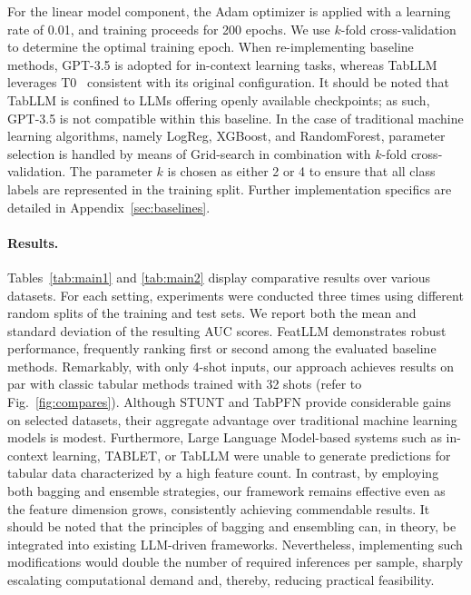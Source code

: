 For the linear model component, the Adam optimizer is applied with a learning rate of 0.01, and training proceeds for 200 epochs. We use $k$-fold cross-validation to determine the optimal training epoch. When re-implementing baseline methods, GPT-3.5 is adopted for in-context learning tasks, whereas TabLLM leverages T0~\cite{sanh2022multitask} consistent with its original configuration. It should be noted that TabLLM is confined to LLMs offering openly available checkpoints; as such, GPT-3.5 is not compatible within this baseline. In the case of traditional machine learning algorithms, namely LogReg, XGBoost, and RandomForest, parameter selection is handled by means of Grid-search in combination with $k$-fold cross-validation. The parameter $k$ is chosen as either 2 or 4 to ensure that all class labels are represented in the training split. Further implementation specifics are detailed in Appendix~\ref{sec:baselines}.

\vspace*{-0.12in}
\paragraph{Results.}
Tables~\ref{tab:main1} and \ref{tab:main2} display comparative results over various datasets. For each setting, experiments were conducted three times using different random splits of the training and test sets. We report both the mean and standard deviation of the resulting AUC scores. \textsf{FeatLLM} demonstrates robust performance, frequently ranking first or second among the evaluated baseline methods. Remarkably, with only 4-shot inputs, our approach achieves results on par with classic tabular methods trained with 32 shots (refer to Fig.~\ref{fig:compares}). Although STUNT and TabPFN provide considerable gains on selected datasets, their aggregate advantage over traditional machine learning models is modest. Furthermore, Large Language Model-based systems such as in-context learning, TABLET, or TabLLM were unable to generate predictions for tabular data characterized by a high feature count. In contrast, by employing both bagging and ensemble strategies, our framework remains effective even as the feature dimension grows, consistently achieving commendable results. It should be noted that the principles of bagging and ensembling can, in theory, be integrated into existing LLM-driven frameworks. Nevertheless, implementing such modifications would double the number of required inferences per sample, sharply escalating computational demand and, thereby, reducing practical feasibility. 

